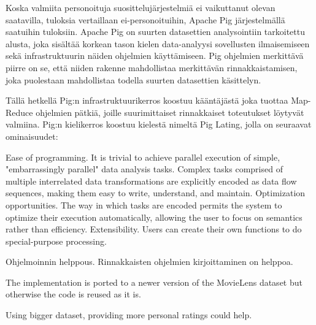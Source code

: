 \documentclass[main.tex]{thesis.tex}
\begin{document}
Koska valmiita personoituja suosittelujärjestelmiä ei vaikuttanut olevan saatavilla, tuloksia vertaillaan ei-personoituihin, Apache Pig järjestelmällä saatuihin tuloksiin.
Apache Pig on suurten datasettien analysointiin tarkoitettu alusta, joka sisältää korkean tason kielen data-analyysi sovellusten ilmaisemiseen sekä infrastruktuurin näiden ohjelmien käyttämiseen.
Pig ohjelmien merkittävä piirre on se, että niiden rakenne mahdollistaa merkittävän rinnakkaistamisen, joka puolestaan mahdollistaa todella suurten datasettien käsittelyn. \cite{pig17}

Tällä hetkellä Pig:n infrastruktuurikerros koostuu kääntäjästä joka tuottaa Map-Reduce ohjelmien pätkiä, joille suurimittaiset rinnakkaiset toteutukset löytyvät valmiina.
Pig:n kielikerros koostuu kielestä nimeltä Pig Lating, jolla on seuraavat ominaisuudet:

Ease of programming. It is trivial to achieve parallel execution of simple, "embarrassingly parallel" data analysis tasks. Complex tasks comprised of multiple interrelated data transformations are explicitly encoded as data flow sequences, making them easy to write, understand, and maintain.
Optimization opportunities. The way in which tasks are encoded permits the system to optimize their execution automatically, allowing the user to focus on semantics rather than efficiency.
Extensibility. Users can create their own functions to do special-purpose processing. \cite{pig17}

Ohjelmoinnin helppous. Rinnakkaisten ohjelmien kirjoittaminen on helppoa.

The implementation is ported to a newer version of the MovieLens dataset but otherwise the code is reused as it is.

Using bigger dataset, providing more personal ratings could help.
\end{document}
